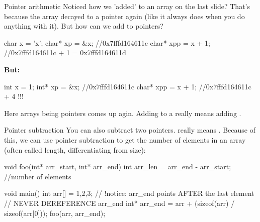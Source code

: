 \documentclass[10pt,graphics,aspectratio=169,table]{beamer}
\begin{document}
\begin{frame}[fragile]{Pointer arithmetic}
    Noticed how we 'added' to an array on the last slide?
    That's because the array decayed to a pointer again 
    (like it always does when you do anything with it).
    But how can we add to pointers?
    \begin{codeblock} 
char x = 'x';
char* xp = &x; //0x7fffd164611c
char* xpp = x + 1;  //0x7fffd164611c + 1 = 0x7fffd164611d
    \end{codeblock} 

    \textbf{But:} 
    \begin{codeblock} 
int x = 1;
int* xp = &x; //0x7fffd164611c
char* xpp = x + 1;  //0x7fffd164611c + 4  !!!
    \end{codeblock}

    Here arrays being pointers comes up agin. 
    Adding  to a  really means adding .
\end{frame}

\begin{frame}[fragile]{Pointer subtraction}
    You can also subtract two pointers. 
     really means .
    Because of this, we can use pointer subtraction 
    to get the number of elements in an array 
    (often called length, differentiating from size):
    \begin{codeblock} 
void foo(int* arr_start, int* arr_end){ 
   int arr_len = arr_end  - arr_start; //number of elements
}
        
void main(){
    int arr[] = {1,2,3};
    // !notice: arr_end points AFTER the last element
    // NEVER DEREFERENCE arr_end
    int* arr_end = arr + (sizeof(arr) / sizeof(arr[0]));
    foo(arr, arr_end);
}
    \end{codeblock} 
        
\end{frame}
\end{document}

